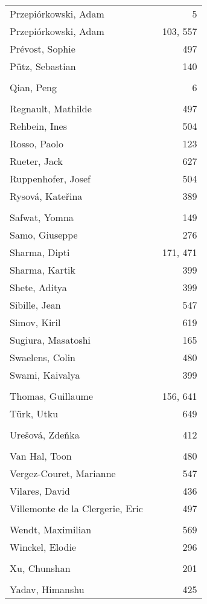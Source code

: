 \documentclass{easychair}
\begin{document}
\begin{longtable}{lp{10em}r}
\\
Przepiórkowski, Adam & & 5 
\\
Przepi\'orkowski, Adam & & 103, 557 
\\
Pr\'evost, Sophie & & 497 
\\
P\"utz, Sebastian & & 140 
\\
\\
Qian, Peng & & 6 
\\
\\
Regnault, Mathilde & & 497 
\\
Rehbein, Ines & & 504 
\\
Rosso, Paolo & & 123 
\\
Rueter, Jack & & 627 
\\
Ruppenhofer, Josef & & 504 
\\
Rysov\'a, Kate\v{r}ina & & 389 
\\
\\
Safwat, Yomna & & 149 
\\
Samo, Giuseppe & & 276 
\\
Sharma, Dipti & & 171, 471 
\\
Sharma, Kartik & & 399 
\\
Shete, Aditya & & 399 
\\
Sibille, Jean & & 547 
\\
Simov, Kiril & & 619 
\\
Sugiura, Masatoshi & & 165 
\\
Swaelens, Colin & & 480 
\\
Swami, Kaivalya & & 399 
\\
\\
Thomas, Guillaume & & 156, 641 
\\
T\"urk, Utku & & 649 
\\
\\
Ure\v{s}ov\'a, Zde\v{n}ka & & 412 
\\
\\
Van Hal, Toon & & 480 
\\
Vergez-Couret, Marianne & & 547 
\\
Vilares, David & & 436 
\\
Villemonte de la Clergerie, Eric & & 497 
\\
\\
Wendt, Maximilian & & 569 
\\
Winckel, Elodie & & 296 
\\
\\
Xu, Chunshan & & 201 
\\
\\
Yadav, Himanshu & & 425 

\end{longtable}
\end{document}
